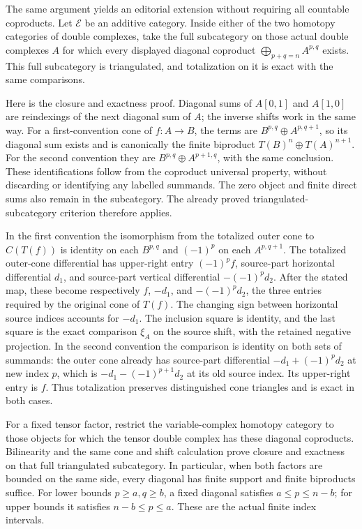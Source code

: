 \documentclass[11pt]{article}
\begin{document}
The same argument yields an editorial extension without requiring all countable coproducts. Let \(\mathcal E\) be an additive category. Inside either of the two homotopy categories of double complexes,\allowbreak{} take the full subcategory on those actual double complexes \(A\) for which every displayed diagonal coproduct \(\bigoplus_{p+q=n}A^{p,q}\) exists. This full subcategory is triangulated,\allowbreak{} and totalization on it is exact with the same comparisons.

Here is the closure and exactness proof. Diagonal sums of \(A[0,1]\) and \(A[1,0]\) are reindexings of the next diagonal sum of \(A\); the inverse shifts work in the same way. For a first-convention cone of \(f:A\to B\),\allowbreak{} the terms are \(B^{p,q}\oplus A^{p,q+1}\),\allowbreak{} so its diagonal sum exists and is canonically the finite biproduct \(T(B)^n\oplus T(A)^{n+1}\). For the second convention they are \(B^{p,q}\oplus A^{p+1,q}\),\allowbreak{} with the same conclusion. These identifications follow from the coproduct universal property,\allowbreak{} without discarding or identifying any labelled summands. The zero object and finite direct sums also remain in the subcategory. The already proved triangulated-subcategory criterion therefore applies.

In the first convention the isomorphism from the totalized outer cone to \(C(T(f))\) is identity on each \(B^{p,q}\) and \((-1)^p\) on each \(A^{p,q+1}\). The totalized outer-cone differential has upper-right entry \((-1)^pf\),\allowbreak{} source-part horizontal differential \(d_1\),\allowbreak{} and source-part vertical differential \(-(-1)^pd_2\). After the stated map,\allowbreak{} these become respectively \(f\),\allowbreak{} \(-d_1\),\allowbreak{} and \(-(-1)^pd_2\),\allowbreak{} the three entries required by the original cone of \(T(f)\). The changing sign between horizontal source indices accounts for \(-d_1\). The inclusion square is identity,\allowbreak{} and the last square is the exact comparison \(\xi_A\) on the source shift,\allowbreak{} with the retained negative projection. In the second convention the comparison is identity on both sets of summands:\allowbreak{} the outer cone already has source-part differential \(-d_1+(-1)^{p}d_2\) at new index \(p\),\allowbreak{} which is \(-d_1-(-1)^{p+1}d_2\) at its old source index. Its upper-right entry is \(f\). Thus totalization preserves distinguished cone triangles and is exact in both cases.

For a fixed tensor factor,\allowbreak{} restrict the variable-complex homotopy category to those objects for which the tensor double complex has these diagonal coproducts. Bilinearity and the same cone and shift calculation prove closure and exactness on that full triangulated subcategory. In particular,\allowbreak{} when both factors are bounded on the same side,\allowbreak{} every diagonal has finite support and finite biproducts suffice. For lower bounds \(p\geq a,q\geq b\),\allowbreak{} a fixed diagonal satisfies \(a\leq p\leq n-b\); for upper bounds it satisfies \(n-b\leq p\leq a\). These are the actual finite index intervals.
\end{document}
